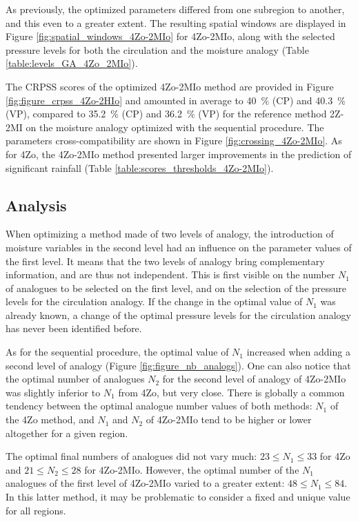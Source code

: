 \documentclass[review]{elsarticle}
\begin{document}
As previously, the optimized parameters differed from one subregion to another, and this even to a greater extent. The resulting spatial windows are displayed in Figure \ref{fig:spatial_windows_4Zo-2MIo} for 4Zo-2MIo, along with the selected pressure levels for both the circulation and the moisture analogy (Table \ref{table:levels_GA_4Zo_2MIo}). 

The CRPSS scores of the optimized 4Zo-2MIo method are provided in Figure \ref{fig:figure_crpss_4Zo-2HIo} and amounted in average to 40~\% (CP) and 40.3~\% (VP), compared to 35.2~\% (CP) and 36.2~\% (VP) for the reference method 2Z-2MI on the moisture analogy optimized with the sequential procedure. The parameters cross-compatibility are shown in Figure \ref{fig:crossing_4Zo-2MIo}. As for 4Zo, the 4Zo-2MIo method presented larger improvements in the prediction of significant rainfall (Table \ref{table:scores_thresholds_4Zo-2MIo}).


\subsection{Analysis}

When optimizing a method made of two levels of analogy, the introduction of moisture variables in the second level had an influence on the parameter values of the first level. It means that the two levels of analogy bring complementary information, and are thus not independent. This is first visible on the number $N_{1}$ of analogues to be selected on the first level, and on the selection of the pressure levels for the circulation analogy. If the change in the optimal value of $N_{1}$ was already known, a change of the optimal pressure levels for the circulation analogy has never been identified before.

As for the sequential procedure, the optimal value of $N_{1}$ increased when adding a second level of analogy (Figure \ref{fig:figure_nb_analogs}). One can also notice that the optimal number of analogues $N_{2}$ for the second level of analogy of 4Zo-2MIo was slightly inferior to $N_{1}$ from 4Zo, but very close. There is globally a common tendency between the optimal analogue number values of both methods: $N_{1}$ of the 4Zo method, and $N_{1}$ and $N_{2}$ of 4Zo-2MIo tend to be higher or lower altogether for a given region.

The optimal final numbers of analogues did not vary much: $23 \leq N_{1} \leq 33$ for 4Zo and $21 \leq N_{2} \leq 28$ for 4Zo-2MIo. However, the optimal number of the $N_{1}$ analogues of the first level of 4Zo-2MIo varied to a greater extent: $48 \leq N_{1} \leq 84$. In this latter method, it may be problematic to consider a fixed and unique value for all regions.
\end{document}

